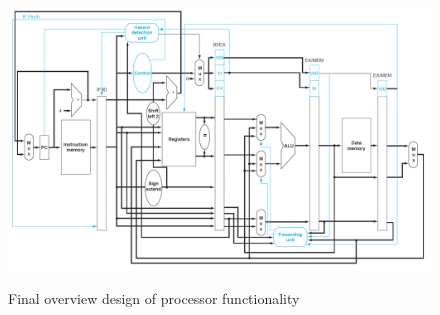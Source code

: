 \begin{figure}[h]
	\caption{Final overview design of processor functionality}
	\includegraphics[scale=0.65, angle=90]{figures/design2.png}
	\label{fig:final-2-2-landscape}
\end{figure}